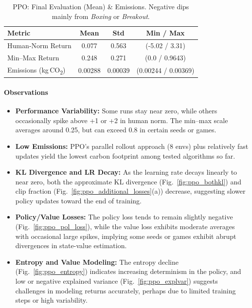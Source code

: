 \begin{table} 
	\caption{PPO: Final Evaluation (Mean) \& Emissions. Negative dips mainly from \emph{Boxing} or \emph{Breakout}.}
	\label{tab:ppo_eval}
	\centering
	\begin{tabular}{lccc}
		\toprule
		\textbf{Metric} & \textbf{Mean} & \textbf{Std} & \textbf{Min / Max}\\
		\midrule
		Human‐Norm Return & 0.077 & 0.563 & (-5.02 / 3.31)\\
		Min--Max Return   & 0.248 & 0.271 & (0.0 / 0.9643)\\
		Emissions (kg\,CO\textsubscript{2}) & 0.00288 & 0.00039 & (0.00244 / 0.00369)\\
		\bottomrule
	\end{tabular}
\end{table}
\medskip
\paragraph{Observations}
\begin{itemize}
	\item \textbf{Performance Variability:} 
	Some runs stay near zero, while others occasionally spike above +1 or +2 in human norm. 
	The min--max scale averages around 0.25, but can exceed 0.8 in certain seeds or games.
	\item \textbf{Low Emissions:} 
	PPO's parallel rollout approach (8 envs) plus relatively fast updates 
	yield the lowest carbon footprint among tested algorithms so far.
	\item \textbf{KL Divergence and LR Decay:} As the learning rate decays linearly to near zero, both the approximate KL divergence (Fig.~\ref{fig:ppo_bothkl}) and clip fraction (Fig.~\ref{fig:ppo_additional_losses}(a)) decrease, suggesting slower policy updates toward the end of training.
	\item \textbf{Policy/Value Losses:} The policy loss tends to remain slightly negative (Fig.~\ref{fig:ppo_pol_loss}), while the value loss exhibits moderate averages with occasional large spikes, implying some seeds or games exhibit abrupt divergences in state-value estimation.
	\item \textbf{Entropy and Value Modeling:} The entropy decline (Fig.~\ref{fig:ppo_entropy}) indicates increasing determinism in the policy, and low or negative explained variance (Fig.~\ref{fig:ppo_explvar}) suggests challenges in modeling returns accurately, perhaps due to limited training steps or high variability.
\end{itemize}

